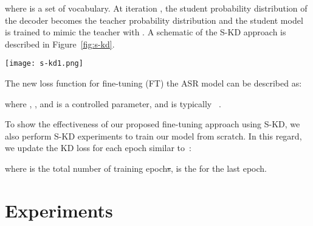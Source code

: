 \documentclass{article}
\begin{document}
where  is a set of vocabulary. At iteration , the student probability distribution  of the decoder becomes the teacher probability distribution  and the student model is trained to mimic the teacher with .
A schematic of the S-KD approach is described in Figure~\ref{fig:s-kd}. 
\begin{figure*}[ht]
\vskip 0.2in
\begin{center}
    
    \centerline{\texttt{[image: s-kd1.png]}}
    \caption{Fine-tuning ASR using the S-KD approch. The student at  becomes the teacher at iteration  and the model is trained with the loss }
    \label{fig:s-kd}
    \end{center}
    \vskip -0.2in

\end{figure*}
The new loss function for fine-tuning (FT) the ASR model can be described as:    


where , , and  is a controlled parameter, and is typically ~\citep{sony}. 


To show the effectiveness of our proposed fine-tuning approach using  S-KD, we also perform S-KD experiments to train our model from scratch. In this regard, we update the KD loss for each epoch similar to~\citep{selfkdgeneralization}:

where  is the total number of training epoch\sout{s},  is the  for the last epoch. 

\section{Experiments}
\label{sec:experiments}
\end{document}
